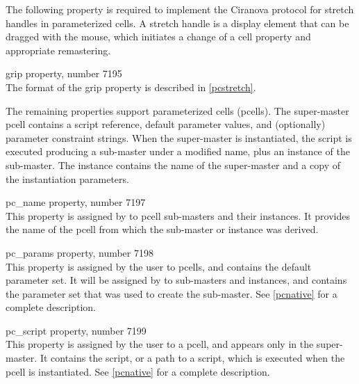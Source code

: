 The following property is required to implement the Ciranova protocol
for stretch handles in parameterized cells.  A stretch handle is a
display element that can be dragged with the mouse, which initiates a
change of a cell property and appropriate remastering.

\begin{description}
\item{\et grip} property, number 7195\\
The format of the {\et grip} property is described in \ref{pcstretch}.
\end{description}

The remaining properties support parameterized cells (pcells).  The
super-master pcell contains a script reference, default parameter
values, and (optionally) parameter constraint strings.  When the
super-master is instantiated, the script is executed producing a
sub-master under a modified name, plus an instance of the sub-master. 
The instance contains the name of the super-master and a copy of the
instantiation parameters.

\begin{description}
\item{\et pc\_name} property, number 7197\\
This property is assigned by {\Xic} to pcell sub-masters and their
instances.  It provides the name of the pcell from which the
sub-master or instance was derived.

\item{\et pc\_params} property, number 7198\\
This property is assigned by the user to pcells, and contains the
default parameter set.  It will be assigned by {\Xic} to sub-masters
and instances, and contains the parameter set that was used to create
the sub-master.  See \ref{pcnative} for a complete description.

\item{\et pc\_script} property, number 7199\\
This property is assigned by the user to a pcell, and appears only in
the super-master.  It contains the script, or a path to a script,
which is executed when the pcell is instantiated.  See \ref{pcnative}
for a complete description.
\end{description}


